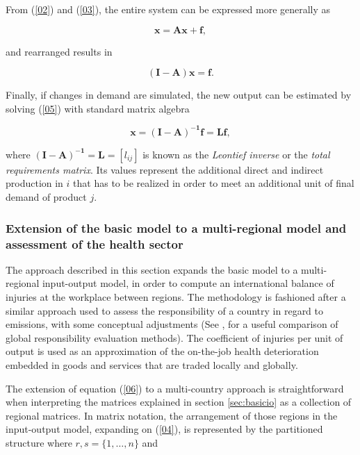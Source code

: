 \documentclass[a4paper,12pt, ]{article}
\begin{document}
From (\ref{02}) and (\ref{03}), the entire system can be expressed more generally as

\begin{equation} 
\mathbf{x = Ax+f}, 
\label{04} 
\end{equation}

\noindent and rearranged results in

\begin{equation} 
\mathbf{(I-A)x = f}. 
\label{05} 
\end{equation}

\noindent Finally, if changes in demand are simulated, the new output can be estimated by solving (\ref{05}) with standard matrix algebra

\begin{equation} 
\mathbf{x = (I-A)^{-1}f=Lf}, 
\label{06} 
\end{equation}

\noindent where $\mathbf{(I-A)^{-1}=L=}[l_{ij}]$ is known as the \textit{Leontief inverse} or the \textit{total requirements matrix}. Its values represent the additional direct and indirect production in $i$ that has to be realized in order to meet an additional unit of final demand of product $j$.

\subsubsection[Multi-regional model]{Extension of the basic model to a multi-regional model and assessment of the health sector}
\label{sec:mregmod}

The approach described in this section expands the basic model to a multi-regional input-output model, in order to compute an international balance of injuries at the workplace between regions. The methodology is fashioned after a similar approach used to assess the responsibility of a country in regard to emissions, with some conceptual adjustments (See \citealp{serranodietz2010}, for a useful comparison of global responsibility evaluation methods). The coefficient of injuries per unit of output is used as
an approximation of the on-the-job health deterioration embedded in goods and services that are traded locally and globally. 


The extension of equation (\ref{06}) to a multi-country approach is straightforward when interpreting the matrices explained in section \ref{sec:basicio} as a collection of regional matrices. In matrix notation, the arrangement of those regions in the input-output model, expanding on (\ref{04}), is represented by the partitioned structure where $r,s=\{1,\ldots,n\}$ and
\end{document}

